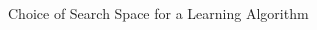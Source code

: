 \begin{frame}{Choice of Search Space for a Learning Algorithm}
  \begin{columns}
  	
  	\begin{column}{0.4\textwidth}
  		\begin{center}
  			

\end{center}
\end{column}
\end{columns}
\end{frame}
